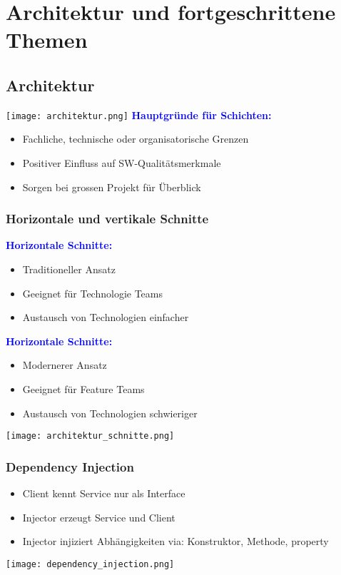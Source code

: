 
\section{Architektur und fortgeschrittene Themen}
\subsection{Architektur}
\texttt{[image: architektur.png]}
\textbf{\textcolor{blue}{Hauptgründe für Schichten:}}
\begin{itemize}[topsep=0pt, leftmargin=4mm]
    \setlength\itemsep{-0.3em}
    \item Fachliche, technische oder organisatorische Grenzen
    \item Positiver Einfluss auf SW-Qualitätsmerkmale
    \item Sorgen bei grossen Projekt für Überblick
\end{itemize}
\subsubsection{Horizontale und vertikale Schnitte}
\textbf{\textcolor{blue}{Horizontale Schnitte:}}
\begin{itemize}[topsep=0pt, leftmargin=4mm]
    \setlength\itemsep{-0.3em}
    \item Traditioneller Ansatz
    \item Geeignet für \dq Technologie Teams\dq
    \item Austausch von Technologien einfacher
\end{itemize}
\textbf{\textcolor{blue}{Horizontale Schnitte:}}
\begin{itemize}[topsep=0pt, leftmargin=4mm]
    \setlength\itemsep{-0.3em}
    \item Modernerer Ansatz
    \item Geeignet für \dq Feature Teams\dq
    \item Austausch von Technologien schwieriger
\end{itemize}
\texttt{[image: architektur\_schnitte.png]}
\subsubsection{Dependency Injection}
\begin{itemize}[topsep=0pt, leftmargin=4mm]
    \setlength\itemsep{-0.3em}
    \item Client kennt Service nur als Interface
    \item Injector erzeugt Service und Client
    \item Injector injiziert Abhängigkeiten via: Konstruktor, Methode, property
\end{itemize}
\begin{center}
    \texttt{[image: dependency\_injection.png]}
\end{center}
